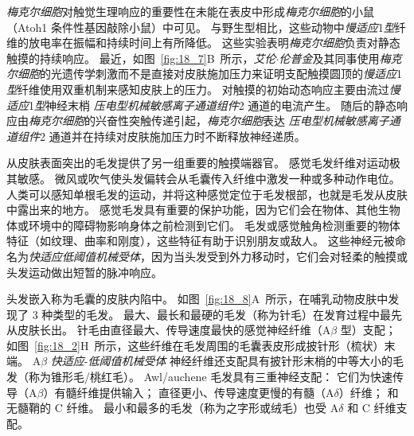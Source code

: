 \textit{梅克尔细胞}对触觉生理响应的重要性在未能在表皮中形成\textit{梅克尔细胞}的小鼠（Atoh1 条件性基因敲除小鼠）中可见。
与野生型相比，这些动物中\textit{慢适应}1\textit{型}纤维的放电率在振幅和持续时间上有所降低。
这些实验表明\textit{梅克尔细胞}负责对静态触摸的持续响应。
最近，如图~\ref{fig:18_7}B~所示，\textit{艾伦$\cdot$伦普金}及其同事使用\textit{梅克尔细胞}的光遗传学刺激而不是直接对皮肤施加压力来证明支配触摸圆顶的\textit{慢适应}1\textit{型}纤维使用双重机制来感知皮肤上的压力。
对触摸的初始动态响应主要由流过\textit{慢适应}1\textit{型}神经末梢 \textit{压电型机械敏感离子通道组件}2 通道的电流产生。
随后的静态响应由\textit{梅克尔细胞}的兴奋性突触传递引起，\textit{梅克尔细胞}表达 \textit{压电型机械敏感离子通道组件}2 通道并在持续对皮肤施加压力时不断释放神经递质。


从皮肤表面突出的毛发提供了另一组重要的触摸端器官。 
感觉毛发纤维对运动极其敏感。
微风或吹气使头发偏转会从毛囊传入纤维中激发一种或多种动作电位。
人类可以感知单根毛发的运动，并将这种感觉定位于毛发根部，也就是毛发从皮肤中露出来的地方。
感觉毛发具有重要的保护功能，因为它们会在物体、其他生物体或环境中的障碍物影响身体之前检测到它们。
毛发或感觉触角检测重要的物体特征（如纹理、曲率和刚度），这些特征有助于识别朋友或敌人。
这些神经元被命名为\textit{快适应低阈值机械受体}，因为当头发受到外力移动时，它们会对轻柔的触摸或头发运动做出短暂的脉冲响应。


头发嵌入称为毛囊的皮肤内陷中。
如图~\ref{fig:18_8}A~所示，在哺乳动物皮肤中发现了 3 种类型的毛发。
最大、最长和最硬的毛发（称为针毛）在发育过程中最先从皮肤长出。
针毛由直径最大、传导速度最快的感觉神经纤维（A$\beta$ 型）支配；
如图~\ref{fig:18_2}H~所示，这些纤维在毛发周围的毛囊表皮形成披针形（梳状）末端。
A$\beta$ \textit{快适应}-\textit{低阈值机械受体} 神经纤维还支配具有披针形末梢的中等大小的毛发（称为锥形毛/桃红毛）。
Awl/auchene 毛发具有三重神经支配：
它们为快速传导（A$\beta$）有髓纤维提供输入；
直径更小、传导速度更慢的有髓（A$\delta$）纤维；
和无髓鞘的 C 纤维。
最小和最多的毛发（称为之字形或绒毛）也受 A$\delta$ 和 C 纤维支配。


